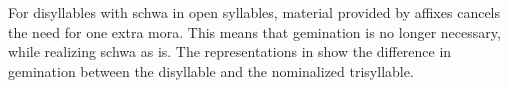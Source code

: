 
For disyllables with schwa in open syllables, material provided by affixes cancels the need for one extra mora. This means that gemination is no longer necessary, while realizing schwa as \I{} is. The representations in   show the difference in gemination between the disyllable and the nominalized  trisyllable.

